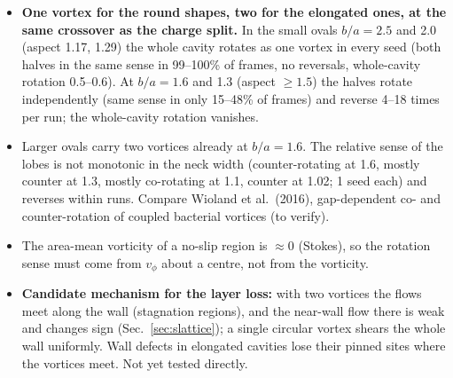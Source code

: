 \begin{itemize}
  \item \textbf{One vortex for the round shapes, two for the elongated ones, at the same crossover as the charge split.} In the small ovals
        $b/a=2.5$ and 2.0 (aspect 1.17, 1.29) the whole cavity rotates as one vortex in every seed (both halves in the same sense in
        99--100\% of frames, no reversals, whole-cavity rotation 0.5--0.6). At $b/a=1.6$ and 1.3 (aspect $\ge1.5$) the halves rotate
        independently (same sense in only 15--48\% of frames) and reverse 4--18 times per run; the whole-cavity rotation vanishes.
  \item Larger ovals carry two vortices already at $b/a=1.6$. The relative sense of the lobes is not monotonic in the neck width
        (counter-rotating at 1.6, mostly counter at 1.3, mostly co-rotating at 1.1, counter at 1.02; 1 seed each) and reverses
        within runs. Compare Wioland et al.\ (2016), gap-dependent co- and counter-rotation of coupled bacterial vortices (to verify).
  \item The area-mean vorticity of a no-slip region is $\approx0$ (Stokes), so the rotation sense must come from $v_\phi$ about a centre,
        not from the vorticity.
  \item \textbf{Candidate mechanism for the layer loss:} with two vortices the flows meet along the wall (stagnation regions), and the
        near-wall flow there is weak and changes sign (Sec.~\ref{sec:slattice}); a single circular vortex shears the whole wall
        uniformly. Wall defects in elongated cavities lose their pinned sites where the vortices meet. Not yet tested directly.
\end{itemize}
